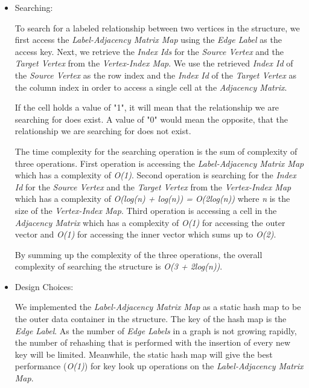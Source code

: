 {\begin{itemize}
Moreover, we use the \textit{Index Id} of the \textit{Source Vertex} as the row index and the \textit{Index Id} of the \textit{Target Vertex} as the column index in order to access a single cell at the \textit{Adjacency Matrix} and set the cell's flag to "1" to indicate an existence of a relationship between the \textit{Source Vertex} and the \textit{Target Vertex}.

\item{Searching:}

To search for a labeled relationship between two vertices in the structure, we first access the \textit{Label-Adjacency Matrix Map} using the \textit{Edge Label} as the access key. Next, we retrieve the \textit{Index Ids} for the \textit{Source Vertex} and the \textit{Target Vertex} from the \textit{Vertex-Index Map}. We use the retrieved \textit{Index Id} of the \textit{Source Vertex} as the row index and the \textit{Index Id} of the \textit{Target Vertex} as the column index in order to access a single cell at the \textit{Adjacency Matrix}.

If the cell holds a value of "1", it will mean that the relationship we are searching for does exist. A value of "0" would mean the opposite, that the relationship we are searching for does not exist.

The time complexity for the searching operation is the sum of complexity of three operations. First operation is accessing the \textit{Label-Adjacency Matrix Map} which has a complexity of \textit{O(1)}. Second operation is searching for the \textit{Index Id} for the \textit{Source Vertex} and the \textit{Target Vertex} from the \textit{Vertex-Index Map} which has a complexity of \textit{O(log(n) + log(n)) = O(2log(n))} where \textit{n} is the size of the \textit{Vertex-Index Map}. Third operation is accessing a cell in the \textit{Adjacency Matrix} which has a complexity of \textit{O(1)} for accessing the outer vector and \textit{O(1)} for accessing the inner vector which sums up to \textit{O(2)}.

By summing up the complexity of the three operations, the overall complexity of searching the structure is \textit{O(3 + 2log(n))}.

\item{Design Choices:}

We implemented the \textit{Label-Adjacency Matrix Map} as a static hash map to be the outer data container in the structure. The key of the hash map is the \textit{Edge Label}. As the number of \textit{Edge Labels} in a graph is not growing rapidly, the number of rehashing that is performed with the insertion of every new key will be limited. Meanwhile, the static hash map will give the best performance (\textit{O(1)}) for key look up operations on the \textit{Label-Adjacency Matrix Map}.


\end{itemize}}
